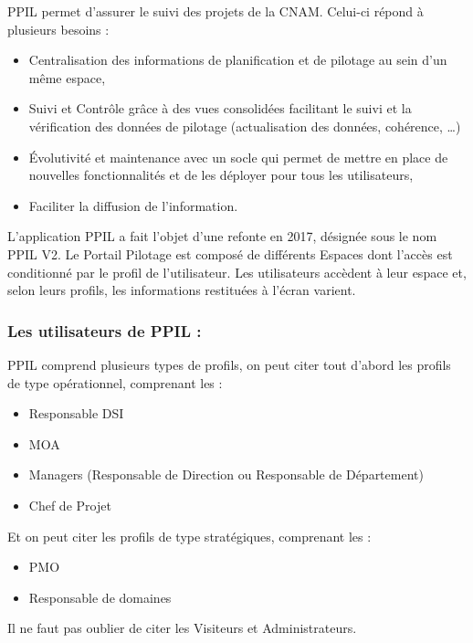 PPIL permet d'assurer le suivi des projets de la CNAM.
Celui-ci répond à plusieurs besoins :
\begin{itemize}
    \item Centralisation des informations de planification et de pilotage  au sein d’un même espace,
    \item Suivi et Contrôle grâce à des vues consolidées facilitant le suivi et la vérification des données de pilotage (actualisation des données, cohérence, …)
    \item Évolutivité et maintenance avec un socle qui permet de mettre en place de nouvelles fonctionnalités et de les déployer pour tous les utilisateurs,
    \item Faciliter la diffusion de l’information.
\end{itemize}
L'application PPIL a fait l'objet d'une refonte en 2017, désignée sous le nom PPIL V2. 
Le Portail Pilotage est composé de différents Espaces dont l’accès est conditionné par le profil de l’utilisateur. Les utilisateurs accèdent à leur espace et, selon leurs profils, les informations restituées à l’écran varient.

\subsubsection{Les utilisateurs de PPIL :}
PPIL comprend plusieurs types de profils, on peut citer tout d'abord les profils de type opérationnel, comprenant les : 
\begin{itemize}
    \item Responsable DSI
    \item MOA
    \item Managers (Responsable de Direction ou Responsable de Département) 
    \item Chef de Projet
\end{itemize}
Et on peut citer les profils de type stratégiques, comprenant les :
\begin{itemize}
    \item PMO
    \item Responsable de domaines
\end{itemize}
Il ne faut pas oublier de citer les Visiteurs et Administrateurs.

